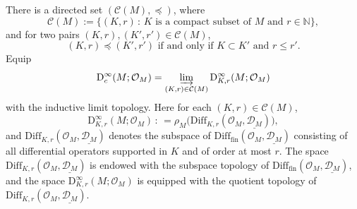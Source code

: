 \documentclass[12pt, a4paper]{amsart}
\newcommand{\BN}{{\mathbb {N}}}
\newcommand{\CO}{{\mathcal {O}}}
\newcommand{\be}{\begin {equation}}
\newcommand{\ee}{\end {equation}}
\renewcommand{\mid}{\,:\,}
\theoremstyle{Theorem}
\theoremstyle{Theorem}
\theoremstyle{Theorem}
\theoremstyle{Theorem}
\theoremstyle{Plain}
\theoremstyle{remark}
\theoremstyle{remark}
\theoremstyle{Definition}
\numberwithin{equation}{section}
\begin{document}
There is a  directed set $(\mathcal{C}(M),\preceq)$, where
\be\label{eq:C(M)} \mathcal{C}(M):=\{(K,r)\mid \text{$K$ is a compact subset of $M$ and $r\in \BN$}\},\ee
and for two pairs $(K,r),(K',r')\in \mathcal{C}(M)$, 
\[\text{$(K,r)\preceq(K',r')$ if and only if $K\subset K'$ and $r\le r'$.}\] Equip \be \label{eq:D_ctop} \mathrm{D}^\infty_c(M;\CO_M)=\varinjlim_{(K,r)\in \mathcal{C}(M)}\mathrm{D}^\infty_{K,r}(M;\CO_M)\ee with the inductive limit topology. 
Here for each $(K,r)\in \mathcal{C}(M)$, \[ \mathrm{D}^\infty_{K,r}(M;\CO_M) \mid =\rho_M\bigl(\mathrm{Diff}_{K,r}(\CO_M,\underline{\mathcal{D}_M})\bigr), \]
and $\mathrm{Diff}_{K,r}(\CO_M,\underline{\mathcal{D}_M})$ denotes the subspace of $\mathrm{Diff}_{\mathrm{fin}}(\CO_M,\underline{\mathcal{D}_M})$ consisting of all  differential operators supported in $K$ and of order at most $r$.
The space $ \mathrm{Diff}_{K,r}(\CO_M,\underline{  \mathcal{D}_M}) $ is endowed with the subspace topology of $\mathrm{Diff}_{\mathrm{fin}}(\CO_M,\underline{\mathcal{D}_M})$, and the space $ \mathrm{D}^\infty_{K,r}(M;\CO_M) $ is equipped with the quotient topology of $\mathrm{Diff}_{K,r}(\CO_M,\underline{\mathcal{D}_M})$.

\end{document}
